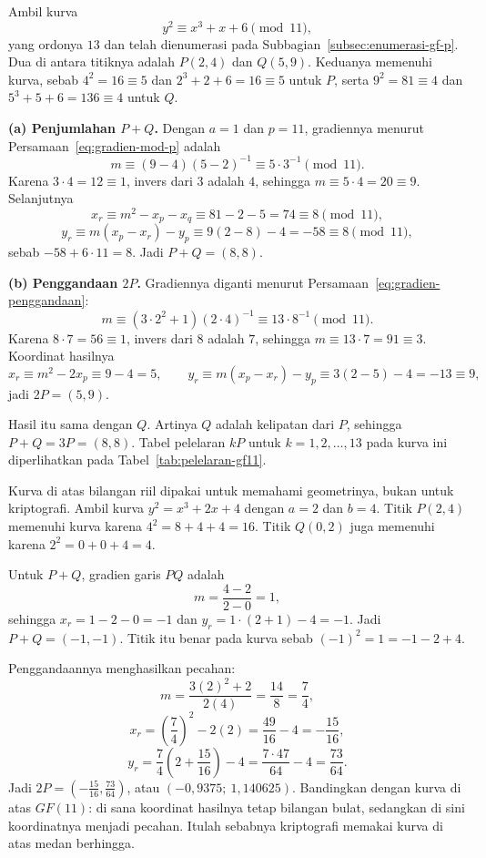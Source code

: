 \begin{example}
\label{ex:gf11}
Ambil kurva
\[
y^2 \equiv x^3 + x + 6 \pmod{11},
\]
yang ordonya $13$ dan telah dienumerasi pada
Subbagian~\ref{subsec:enumerasi-gf-p}. Dua di antara titiknya adalah $P(2, 4)$
dan $Q(5, 9)$. Keduanya memenuhi kurva, sebab $4^2 = 16 \equiv 5$ dan
$2^3 + 2 + 6 = 16 \equiv 5$ untuk $P$, serta $9^2 = 81 \equiv 4$ dan
$5^3 + 5 + 6 = 136 \equiv 4$ untuk $Q$.

\textbf{(a) Penjumlahan $P + Q$.} Dengan $a = 1$ dan $p = 11$, gradiennya
menurut Persamaan~\eqref{eq:gradien-mod-p} adalah
\[
m \equiv (9 - 4)(5 - 2)^{-1} \equiv 5 \cdot 3^{-1} \pmod{11} .
\]
Karena $3 \cdot 4 = 12 \equiv 1$, invers dari $3$ adalah $4$, sehingga
$m \equiv 5 \cdot 4 = 20 \equiv 9$. Selanjutnya
\[
x_r \equiv m^2 - x_p - x_q \equiv 81 - 2 - 5 = 74 \equiv 8 \pmod{11},
\]
\[
y_r \equiv m(x_p - x_r) - y_p \equiv 9(2 - 8) - 4 = -58 \equiv 8 \pmod{11},
\]
sebab $-58 + 6 \cdot 11 = 8$. Jadi $P + Q = (8, 8)$.

\textbf{(b) Penggandaan $2P$.} Gradiennya diganti menurut
Persamaan~\eqref{eq:gradien-penggandaan}:
\[
m \equiv (3 \cdot 2^2 + 1)(2 \cdot 4)^{-1} \equiv 13 \cdot 8^{-1}
\pmod{11} .
\]
Karena $8 \cdot 7 = 56 \equiv 1$, invers dari $8$ adalah $7$, sehingga
$m \equiv 13 \cdot 7 = 91 \equiv 3$. Koordinat hasilnya
\[
x_r \equiv m^2 - 2x_p \equiv 9 - 4 = 5, \qquad
y_r \equiv m(x_p - x_r) - y_p \equiv 3(2 - 5) - 4 = -13 \equiv 9 ,
\]
jadi $2P = (5, 9)$.

Hasil itu sama dengan $Q$. Artinya $Q$ adalah kelipatan dari $P$, sehingga
$P + Q = 3P = (8, 8)$. Tabel pelelaran $kP$ untuk $k = 1, 2, \dots, 13$ pada
kurva ini diperlihatkan pada Tabel~\ref{tab:pelelaran-gf11}.
\end{example}

\begin{example}
\label{ex:real}
Kurva di atas bilangan riil dipakai untuk memahami geometrinya, bukan untuk
kriptografi. Ambil kurva $y^2 = x^3 + 2x + 4$ dengan $a = 2$ dan $b = 4$.
Titik $P(2, 4)$ memenuhi kurva karena $4^2 = 8 + 4 + 4 = 16$. Titik $Q(0, 2)$
juga memenuhi karena $2^2 = 0 + 0 + 4 = 4$.

Untuk $P + Q$, gradien garis $PQ$ adalah
\[
m = \frac{4 - 2}{2 - 0} = 1 ,
\]
sehingga $x_r = 1 - 2 - 0 = -1$ dan $y_r = 1 \cdot (2 + 1) - 4 = -1$. Jadi
$P + Q = (-1, -1)$. Titik itu benar pada kurva sebab
$(-1)^2 = 1 = -1 - 2 + 4$.

Penggandaannya menghasilkan pecahan:
\[
m = \frac{3(2)^2 + 2}{2(4)} = \frac{14}{8} = \frac{7}{4},
\]
\[
x_r = \left(\frac{7}{4}\right)^2 - 2(2) = \frac{49}{16} - 4 = -\frac{15}{16},
\]
\[
y_r = \frac{7}{4}\left(2 + \frac{15}{16}\right) - 4
    = \frac{7 \cdot 47}{64} - 4 = \frac{73}{64} .
\]
Jadi $2P = \left(-\frac{15}{16}, \frac{73}{64}\right)$, atau
$(-0{,}9375;\ 1{,}140625)$. Bandingkan dengan kurva di atas $GF(11)$: di sana
koordinat hasilnya tetap bilangan bulat, sedangkan di sini koordinatnya
menjadi pecahan. Itulah sebabnya kriptografi memakai kurva di atas medan
berhingga.
\end{example}

